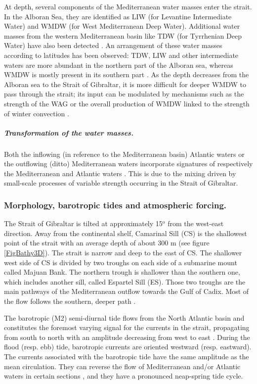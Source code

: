At depth, several components of the Mediterranean water masses enter the strait. In the Alboran Sea, they are identified as LIW (for Levantine Intermediate Water) and WMDW (for West Mediterranean Deep Water).  Additional water masses from the western Mediterranean basin like TDW (for Tyrrhenian Deep Water) have also been detected \citep{Millot2014}. An arrangement of these water masses according to latitudes has been observed: TDW, LIW and other intermediate waters are more abundant in the northern part of the Alboran sea, whereas WMDW is mostly present in its southern part \citep{Millot2014}. As the depth decreases from the Alboran sea to the Strait of Gibraltar, it is more difficult for deeper WMDW to pass through the strait; its input can be modulated by mechanisms such as the strength of the WAG or the overall production of WMDW linked to the strength of winter convection \citep{naranjo_2012}.

\subparagraph{Transformation of the water masses.}
Both the inflowing (in reference to the Mediterranean basin) Atlantic waters or the outflowing (ditto) Mediterranean waters incorporate signatures of respectively the Mediterranean \citep{macias_2006} and Atlantic waters \citep{millot_2007,GarciaLafuente2011}. This is due to the mixing driven by small-scale processes of variable strength occurring in the Strait of Gibraltar.  


\subsubsection{Morphology, barotropic tides and atmospheric forcing.} 


The Strait of Gibraltar is tilted at approximately 15$^\text{o}$ from the west-east direction. Away from the continental shelf, Camarinal Sill (CS) is the shallowest point of the strait with an average depth of about 300 m (see figure \ref{FigBathy3D}). The strait is narrow and deep to the east of CS. The shallower west side of CS is divided by two troughs on each side of a submarine mount called Majuan Bank. The northern trough is shallower than the southern one, which includes another sill, called Espartel Sill (ES). Those two troughs are the main pathways of the Mediterranean outflow towards the Gulf of Cadix. Most of the flow follows the southern, deeper path \citep{SN2015}.

The barotropic (M2) semi-diurnal tide flows from the North Atlantic basin and constitutes the foremost varying signal for the currents in the strait, propagating from south to north with an amplitude decreasing from west to east \citep{CW90}. During the flood (resp. ebb) tide, barotropic currents are oriented westward (resp. eastward). The currents associated with the barotropic tide have the same amplitude as the mean circulation. They can reverse the flow of Mediterranean and/or Atlantic waters in certain sections \citep{sanchez-roman_2012}, and they have a pronounced neap-spring tide cycle.

